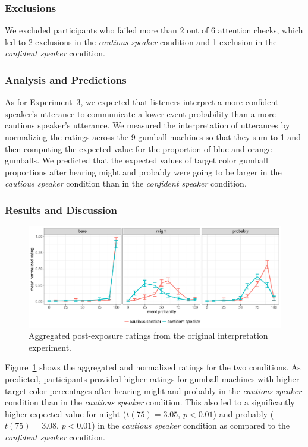 \documentclass[man, floatsintext]{apa6}
\begin{document}
\subsubsection*{Exclusions}

We excluded participants who failed more than 2 out of 6 attention checks, which led to 2 exclusions in the \emph{cautious speaker} condition and 1 exclusion in the \emph{confident speaker} condition.


\subsubsection*{Analysis and Predictions}

As for Experiment~3, we expected that listeners interpret a more confident speaker's utterance 
to communicate a lower event probability than a more cautious speaker's utterance. We measured
the interpretation of utterances by normalizing the ratings across the 9 gumball machines so that they sum to
1 and then computing the expected value for the proportion of blue and orange gumballs. 
We predicted that the expected values of target color gumball proportions after hearing {\sc might} and {\sc probably} 
were going to be larger in the \emph{cautious speaker} condition than in the \emph{confident speaker} condition.

\subsubsection*{Results and Discussion}

\begin{figure}[h!]
\includegraphics[width=\textwidth]{plots/exp-2-ratings.pdf}
\caption{Aggregated post-exposure ratings from the original interpretation experiment.  \label{fig:adaptation-results-comp-orig}}
\end{figure}

Figure~\ref{fig:adaptation-results-comp-orig} shows the aggregated and normalized ratings for the two conditions.  As predicted, participants provided higher ratings for gumball machines with higher target color percentages after hearing {\sc might} and {\sc probably} in the \emph{cautious speaker} condition than in the \emph{cautious speaker} condition. This also led to a significantly higher expected value for {\sc might} ($t(75)=3.05$, $p<0.01$) and {\sc probably} ($t(75)=3.08$, $p<0.01$) in the \emph{cautious speaker} condition as compared to the \emph{confident speaker} condition.
\end{document}
